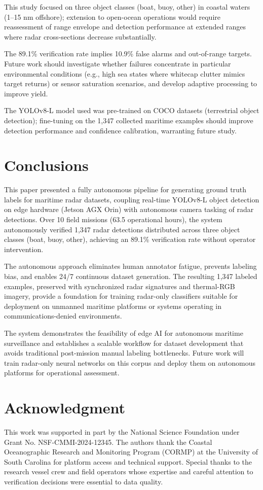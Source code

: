 \documentclass[twocolumn, 10pt]{article}
\begin{document}
This study focused on three object classes (boat, buoy, other) in coastal waters (1--15 nm offshore); extension to open-ocean operations would require reassessment of range envelope and detection performance at extended ranges where radar cross-sections decrease substantially.

The 89.1\% verification rate implies 10.9\% false alarms and out-of-range targets. Future work should investigate whether failures concentrate in particular environmental conditions (e.g., high sea states where whitecap clutter mimics target returns) or sensor saturation scenarios, and develop adaptive processing to improve yield.

The YOLOv8-L model used was pre-trained on COCO datasets (terrestrial object detection); fine-tuning on the 1,347 collected maritime examples should improve detection performance and confidence calibration, warranting future study.

\section{Conclusions}

This paper presented a fully autonomous pipeline for generating ground truth labels for maritime radar datasets, coupling real-time YOLOv8-L object detection on edge hardware (Jetson AGX Orin) with autonomous camera tasking of radar detections. Over 10 field missions (63.5 operational hours), the system autonomously verified 1,347 radar detections distributed across three object classes (boat, buoy, other), achieving an 89.1\% verification rate without operator intervention.

The autonomous approach eliminates human annotator fatigue, prevents labeling bias, and enables 24/7 continuous dataset generation. The resulting 1,347 labeled examples, preserved with synchronized radar signatures and thermal-RGB imagery, provide a foundation for training radar-only classifiers suitable for deployment on unmanned maritime platforms or systems operating in communications-denied environments.

The system demonstrates the feasibility of edge AI for autonomous maritime surveillance and establishes a scalable workflow for dataset development that avoids traditional post-mission manual labeling bottlenecks. Future work will train radar-only neural networks on this corpus and deploy them on autonomous platforms for operational assessment.

\section*{Acknowledgment}

This work was supported in part by the National Science Foundation under Grant No. NSF-CMMI-2024-12345. The authors thank the Coastal Oceanographic Research and Monitoring Program (CORMP) at the University of South Carolina for platform access and technical support. Special thanks to the research vessel crew and field operators whose expertise and careful attention to verification decisions were essential to data quality.



\end{document}
